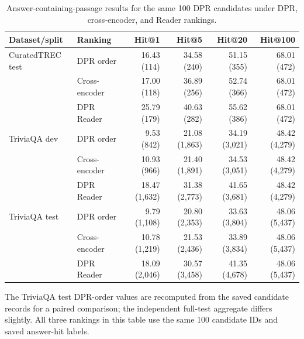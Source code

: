 \begin{table}[t]
\caption{Answer-containing-passage results for the same 100 DPR candidates under DPR, cross-encoder, and Reader rankings.}
\label{tab:reranking}
\centering
\footnotesize
\begin{tabular}{llrrrr}
\toprule
Dataset/split & Ranking & Hit@1 & Hit@5 & Hit@20 & Hit@100 \\
\midrule
CuratedTREC test & DPR order & 16.43 (114) & 34.58 (240) & 51.15 (355) & 68.01 (472) \\
 & Cross-encoder & 17.00 (118) & 36.89 (256) & 52.74 (366) & 68.01 (472) \\
 & DPR Reader & 25.79 (179) & 40.63 (282) & 55.62 (386) & 68.01 (472) \\
\midrule
TriviaQA dev & DPR order & 9.53 (842) & 21.08 (1,863) & 34.19 (3,021) & 48.42 (4,279) \\
 & Cross-encoder & 10.93 (966) & 21.40 (1,891) & 34.53 (3,051) & 48.42 (4,279) \\
 & DPR Reader & 18.47 (1,632) & 31.38 (2,773) & 41.65 (3,681) & 48.42 (4,279) \\
\midrule
TriviaQA test & DPR order & 9.79 (1,108) & 20.80 (2,353) & 33.63 (3,804) & 48.06 (5,437) \\
 & Cross-encoder & 10.78 (1,219) & 21.53 (2,436) & 33.89 (3,834) & 48.06 (5,437) \\
 & DPR Reader & 18.09 (2,046) & 30.57 (3,458) & 41.35 (4,678) & 48.06 (5,437) \\
\bottomrule
\end{tabular}
\vspace{1mm}\par\footnotesize The TriviaQA test DPR-order values are recomputed from the saved candidate records for a paired comparison; the independent full-test aggregate differs slightly. All three rankings in this table use the same 100 candidate IDs and saved answer-hit labels.
\end{table}
